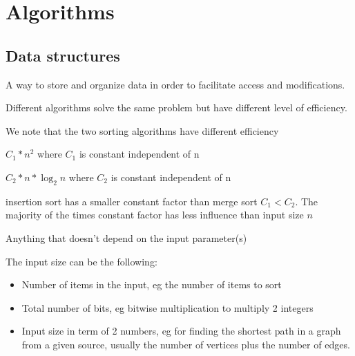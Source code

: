 
\section{Algorithms}
\subsection{Data structures}

\begin{definition}\label{def:data_structure_1}
    A way to store and organize data in order to facilitate access and modifications.
\end{definition}

\begin{definition}[Efficiency]\label{def:efficiency_1}
    Different algorithms solve the same problem but have different level of efficiency.
    
\end{definition}

\begin{eg}\label{eg:insertion_sort_vs_merge_sort_1}
  We note that the two sorting algorithms have different efficiency
  \begin{note}\label{note:insertion_sort_1}
    $C_1*n^2$ where $C_1$ is constant independent of n
  \end{note}

  \begin{note}\label{note:merge_sort_1}
    $C_2 * n * \log_{2}n$ where $C_2$ is constant independent of n
  \end{note}

  \begin{remark}\label{def:constant_factor_1}
    insertion sort has a smaller constant factor than merge sort $C_1 < C_2$. The majority of the times constant factor has less influence than input size $n$
  \end{remark}

  \begin{definition}\label{def:constant_factor_2}
      Anything that doesn't depend on the input parameter(s)
  \end{definition}

  \begin{definition}\label{def:constant_factor_2}
      The input size can be the following:

      \begin{itemize}
          \item Number of items in the input, eg the number of items to sort
          \item Total number of bits, eg bitwise multiplication to multiply 2 integers
          \item Input size in term of 2 numbers, eg for finding the shortest path in a graph from a given source, usually the number of vertices plus the number of edges.
      \end{itemize}
  \end{definition}

  \end{eg}

